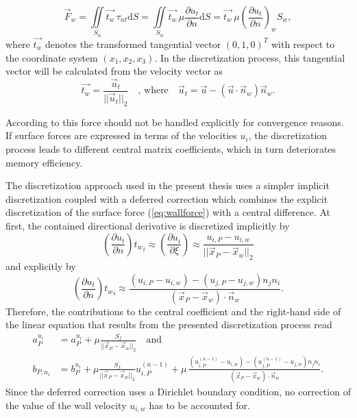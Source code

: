 \begin{equation}
  \label{eq:wallforce}
  \vec{F}_w 
  =  
  \iint\limits_{S_w} \vec{t_w} \, \tau_{nt} \mathrm{d}S
  =
  \iint\limits_{S_w} \vec{t_w} \, \mu \frac{\partial u_t}{\partial n} \mathrm{d}S
  =
  \vec{t_w} \, \mu \left(\frac{\partial u_t}{\partial n}\right)_w S_w,
\end{equation}
where \( \vec{t_w} \) denotes the transformed tangential vector \((0,1,0)^T\) with respect to the coordinate system \((x_1,x_2,x_3)\). In the discretization process, this tangential vector will be calculated from the velocity vector as
\begin{displaymath}
  \vec{t_w} = \frac{\vec{u}_t}{|| \vec{u}_t ||_2} \quad \text{, where} \quad \vec{u}_t = \vec{u} - \left( \vec{u} \cdot \vec{n}_w \right) \vec{n}_w.
\end{displaymath}

According to \cite{ferziger02} this force should not be handled explicitly for convergence reasons. If surface forces are expressed in terms of the velocities \(u_i\), the discretization process leads to different central matrix coefficients, which in turn deteriorates memory efficiency.

The discretization approach used in the present thesis uses a simpler implicit discretization coupled with a deferred correction which combines the explicit discretization of the surface force (\ref{eq:wallforce}) with a central difference. At first, the contained directional derivative is discretized implicitly by
\begin{displaymath}
  \left(\frac{\partial u_t}{\partial n}\right) {t_w}_i
  \approx
  \left(\frac{\partial u_i}{\partial \xi}\right)
  \approx
  \frac{u_{i,P} - u_{i,w}}{|| \vec{x}_P - \vec{x}_w ||_2}
\end{displaymath}
and explicitly by
\begin{displaymath}
  \left(\frac{\partial u_t}{\partial n}\right) {t_w}_i
  \approx
  \frac{\left(u_{i,P}- u_{i,w} \right) - \left(u_{j,P} - u_{j,w}\right) n_j n_i  }{\left( \vec{x}_P - \vec{x}_w \right) \cdot \vec{n}_w}.
\end{displaymath}
Therefore, the contributions to the central coefficient and the right-hand side of the linear equation that results from the presented discretization process read
\begin{align*}
  a_P^{u_i} &= a_P^{u_i} + \mu \frac{S_f}{|| \vec{x}_P - \vec{x}_w ||_2} \quad \text{and} \\
  b_{P,u_i} &= b_P^{u_i} + \mu \frac{S_f}{|| \vec{x}_P - \vec{x}_w ||_2} u_{i,P}^{(n-1)} + 
  \mu \, \frac{\left(u_{i,P}^{(n-1)}- u_{i,w} \right) - \left(u_{j,P}^{(n-1)} - u_{j,w}\right) n_j n_i  }{\left( \vec{x}_P - \vec{x}_w \right) \cdot \vec{n}_w}.
\end{align*}
Since the deferred correction uses a Dirichlet boundary condition, no correction of the value of the wall velocity \(u_{i,w}\) has to be accounted for.

